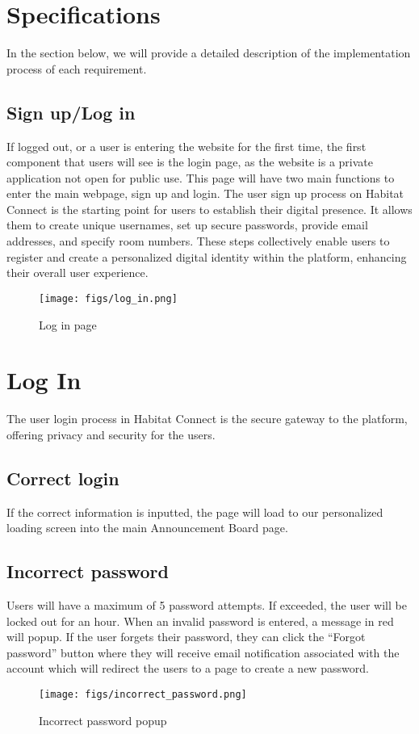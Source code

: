 \documentclass[conference]{IEEEtran}
\begin{document}
\section{Specifications}
In the section below, we will provide a detailed description of the implementation process of each requirement.

\subsection{Sign up/Log in}
If logged out, or a user is entering the website for the first time, the first component that users will see is the login page, as the website is a private application not open for public use. This page will have two main functions to enter the main webpage, sign up and login. The user sign up process on Habitat Connect is the starting point for users to establish their digital presence. It allows them to create unique usernames, set up secure passwords, provide email addresses, and specify room numbers. These steps collectively enable users to register and create a personalized digital identity within the platform, enhancing their overall user experience.
    \begin{figure}[H]
    \centering
    \texttt{[image: figs/log\_in.png]}
    \caption{Log in page}
    \label{fig:Log in page}
    \end{figure}
    
\section*{Log In}
The user login process in Habitat Connect is the secure gateway to the platform, offering privacy and security for the users.
\subsection*{Correct login}
If the correct information is inputted, the page will load to our personalized loading screen into the main Announcement Board page.
\subsection*{Incorrect password}
Users will have a maximum of 5 password attempts. If exceeded, the user will be locked out for an hour. When an invalid password is entered, a message in red will popup. If the user forgets their password, they can click the “Forgot password” button where they will receive email notification associated with the account which will redirect the users to a page to create a new password.
    \begin{figure}[H]
    \centering
    \texttt{[image: figs/incorrect\_password.png]}
    \caption{Incorrect password popup}
    \label{fig:Incorrect password popup}
    \end{figure}
\end{document}
